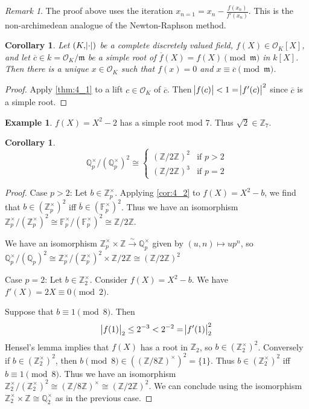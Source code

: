 \documentclass[11pt]{article}
\theoremstyle{definition}
\newtheorem*{example}{Example}
\theoremstyle{plain}
\newtheorem{corollary}[definition]{Corollary}
\theoremstyle{remark}
\newtheorem*{remark}{Remark}
\newcommand{\FF}{\mathbb{F}}
\newcommand{\ZZ}{\mathbb{Z}}
\newcommand{\QQ}{\mathbb{Q}}
\newcommand{\cO}{\mathcal{O}}
\newcommand{\fm}{\mathfrak{m}}
\begin{document}
\begin{remark}
    The proof above uses the iteration $x_{n=1} = x_n - \frac{f(x_n)}{f'(x_n)}$. This is the non-archimedean analogue of the Newton-Raphson method.
\end{remark}

\begin{corollary}\label{cor:4_2}
    Let $(K, \abs{\cdot})$ be a complete discretely valued field, $f(X) \in \cO_K[X]$, and let $\overline{c} \in k = \cO_K / \fm$ be a simple root of $\overline{f}(X) = f(X) \pmod{\fm}$ in $k[X]$. Then there is a unique $x \in \cO_K$ such that $f(x) = 0$ and $x \equiv \overline{c} \pmod{\fm}$.
\end{corollary}
\begin{proof}
    Apply \autoref{thm:4_1} to a lift $c \in \cO_K$ of $\overline{c}$. Then $\abs{f(c)} < 1 = \abs{f'(c)}^2$ since $\overline{c}$ is a simple root.
\end{proof}

\begin{example}
    $f(X) = X^2 - 2$ has a simple root mod $7$. Thus $\sqrt{2} \in \ZZ_7$.
\end{example}

\begin{corollary}\label{cor:4_3}
    \begin{equation*}
        \QQ_p^\times / (\QQ_p^\times)^2 \cong
        \begin{cases}
            (\ZZ / 2 \ZZ)^2 & \text{if } p > 2\\
            (\ZZ / 2 \ZZ)^3 & \text{if } p = 2
        \end{cases}
    \end{equation*}
\end{corollary}
\begin{proof}
    Case $p > 2$: Let $b \in \ZZ_p^\times$. Applying \autoref{cor:4_2} to $f(X) = X^2 - b$, we find that $b \in (\ZZ_p^\times)^2$ iff $\overline{b} \in (\FF_p^\times)^2$. Thus we have an isomorphism $\ZZ_p^\times / (\ZZ_p^\times)^2 \cong \FF_p^\times / (\FF_p^\times)^2 \cong \ZZ / 2\ZZ$.

    We have an isomorphism $\ZZ_p^\times \times \ZZ \xrightarrow{\sim} \QQ_p^\times$ given by $(u, n) \mapsto u p^n$, so $\QQ_p^\times / (\QQ_p)^2 \cong \ZZ_p^\times / (\ZZ_p^\times)^2 \times \ZZ / 2\ZZ \cong (\ZZ / 2\ZZ)^2$

    Case $p = 2$: Let $b \in \ZZ_2^\times$. Consider $f(X) = X^2 - b$. We have $f'(X) = 2X \equiv 0 \pmod{2}$.

    Suppose that $b \equiv 1 \pmod{8}$. Then
    \begin{equation*}
        \abs{f(1)}_2 \le 2^{-3} < 2^{-2} = \abs{f'(1)}_2^2
    \end{equation*}
    Hensel's lemma implies that $f(X)$ has a root in $\ZZ_2$, so $b \in (\ZZ_2^\times)^2$. Conversely if $b \in (\ZZ_2^\times)^2$, then $b \pmod{8} \in ((\ZZ / 8\ZZ)^\times)^2 = \{1\}$. Thus $b \in (\ZZ_2^\times)^2$ iff $b \equiv 1 \pmod{8}$. Thus we have an isomorphism $\ZZ_2^\times / (\ZZ_2^\times)^2 \cong (\ZZ / 8 \ZZ)^\times \cong (\ZZ / 2\ZZ)^2$. We can conclude using the isomorphism $\ZZ_2^\times \times \ZZ \cong \QQ_2^\times$ as in the previous case.
\end{proof}
\end{document}
